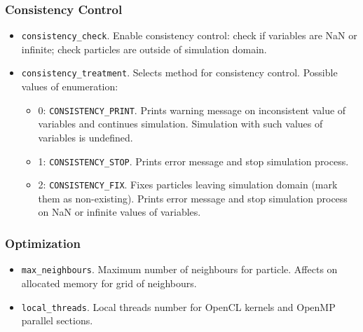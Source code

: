 \subsubsection{Consistency Control}
\begin{itemize}
    \item \verb|consistency_check|. Enable consistency control: check if variables are NaN or infinite; check particles are outside of simulation domain.
    \item \verb|consistency_treatment|. Selects method for consistency control. Possible values of enumeration:
    \begin{itemize}
        \item 0: \verb|CONSISTENCY_PRINT|. Prints warning message on inconsistent value of variables and continues simulation. Simulation with such values of variables is undefined.
        \item 1: \verb|CONSISTENCY_STOP|. Prints error message and stop simulation process.
        \item 2: \verb|CONSISTENCY_FIX|. Fixes particles leaving simulation domain (mark them as non-existing). Prints error message and stop simulation process on NaN or infinite values of variables.
    \end{itemize}
\end{itemize}

\subsubsection{Optimization}
\begin{itemize}
    \item \verb|max_neighbours|. Maximum number of neighbours for particle. Affects on allocated memory for grid of neighbours.
    \item \verb|local_threads|. Local threads number for OpenCL kernels and OpenMP parallel sections.
\end{itemize}